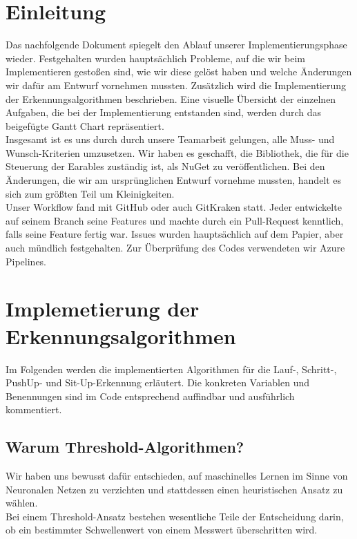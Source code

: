 \documentclass[a4paper,12pt]{article}
\title{\projektName}
\date{\today}
\author{Tec O'Brain}
\begin{document}
\setcounter{page}{2}
\tableofcontents          %
\clearpage
{}

\section{Einleitung}
Das nachfolgende Dokument spiegelt den Ablauf unserer Implementierungsphase wieder. Festgehalten wurden hauptsächlich Probleme, auf die wir beim Implementieren gestoßen sind, wie wir diese gelöst haben und welche Änderungen wir dafür am Entwurf vornehmen mussten. Zusätzlich wird die Implementierung der Erkennungsalgorithmen beschrieben. Eine visuelle Übersicht der einzelnen Aufgaben, die bei der Implementierung entstanden sind, werden durch das beigefügte Gantt Chart repräsentiert.\\
Insgesamt ist es uns durch durch unsere Teamarbeit gelungen, alle Muss- und Wunsch-Kriterien umzusetzen. Wir haben es geschafft, die Bibliothek, die für die Steuerung der Earables zuständig ist, als NuGet zu veröffentlichen. Bei den Änderungen, die wir am ursprünglichen Entwurf vornehme mussten, handelt es sich zum größten Teil um Kleinigkeiten.\\
Unser Workflow fand mit GitHub oder auch GitKraken statt. Jeder entwickelte auf seinem Branch seine Features und machte durch ein Pull-Request kenntlich, falls seine Feature fertig war. Issues wurden hauptsächlich auf dem Papier, aber auch mündlich festgehalten. Zur Überprüfung des Codes verwendeten wir Azure Pipelines.

\section{Implemetierung der Erkennungsalgorithmen}
\label{algorithmen}
Im Folgenden werden die implementierten Algorithmen für die Lauf-, Schritt-, PushUp- und  Sit-Up-Erkennung erläutert. Die konkreten Variablen und Benennungen sind im Code entsprechend auffindbar und ausführlich kommentiert.
\subsection{Warum Threshold-Algorithmen?}
Wir haben uns bewusst dafür entschieden, auf maschinelles Lernen im Sinne von Neuronalen Netzen zu verzichten und stattdessen einen heuristischen Ansatz zu wählen.\\
 Bei einem Threshold-Ansatz bestehen wesentliche Teile der Entscheidung darin, ob ein bestimmter Schwellenwert von einem Messwert überschritten wird.
\end{document}
